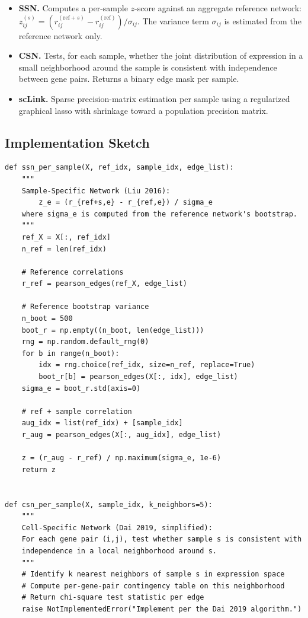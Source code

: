 \documentclass[11pt]{article}
\begin{document}
\begin{itemize}[leftmargin=*]
\item \textbf{SSN.} Computes a per-sample $z$-score against an aggregate reference network: $z_{ij}^{(s)} = (r_{ij}^{(\text{ref}+s)} - r_{ij}^{(\text{ref})}) / \sigma_{ij}$. The variance term $\sigma_{ij}$ is estimated from the reference network only.
\item \textbf{CSN.} Tests, for each sample, whether the joint distribution of expression in a small neighborhood around the sample is consistent with independence between gene pairs. Returns a binary edge mask per sample.
\item \textbf{scLink.} Sparse precision-matrix estimation per sample using a regularized graphical lasso with shrinkage toward a population precision matrix.
\end{itemize}

\subsection{Implementation Sketch}

\begin{lstlisting}[style=pythonstyle,caption={Wrapper for SSN.}]
def ssn_per_sample(X, ref_idx, sample_idx, edge_list):
    """
    Sample-Specific Network (Liu 2016):
        z_e = (r_{ref+s,e} - r_{ref,e}) / sigma_e
    where sigma_e is computed from the reference network's bootstrap.
    """
    ref_X = X[:, ref_idx]
    n_ref = len(ref_idx)

    # Reference correlations
    r_ref = pearson_edges(ref_X, edge_list)

    # Reference bootstrap variance
    n_boot = 500
    boot_r = np.empty((n_boot, len(edge_list)))
    rng = np.random.default_rng(0)
    for b in range(n_boot):
        idx = rng.choice(ref_idx, size=n_ref, replace=True)
        boot_r[b] = pearson_edges(X[:, idx], edge_list)
    sigma_e = boot_r.std(axis=0)

    # ref + sample correlation
    aug_idx = list(ref_idx) + [sample_idx]
    r_aug = pearson_edges(X[:, aug_idx], edge_list)

    z = (r_aug - r_ref) / np.maximum(sigma_e, 1e-6)
    return z


def csn_per_sample(X, sample_idx, k_neighbors=5):
    """
    Cell-Specific Network (Dai 2019, simplified):
    For each gene pair (i,j), test whether sample s is consistent with
    independence in a local neighborhood around s.
    """
    # Identify k nearest neighbors of sample s in expression space
    # Compute per-gene-pair contingency table on this neighborhood
    # Return chi-square test statistic per edge
    raise NotImplementedError("Implement per the Dai 2019 algorithm.")
\end{lstlisting}
\end{document}

